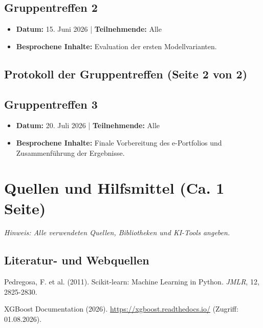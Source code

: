 \documentclass[11pt,a4paper]{article}
\begin{document}
\subsection*{Gruppentreffen 2}
\begin{itemize}[leftmargin=*]
    \item \textbf{Datum:} 15. Juni 2026 | \textbf{Teilnehmende:} Alle
    \item \textbf{Besprochene Inhalte:} Evaluation der ersten Modellvarianten.
\end{itemize}

\newpage
\subsection*{Protokoll der Gruppentreffen (Seite 2 von 2)}
\subsection*{Gruppentreffen 3}
\begin{itemize}[leftmargin=*]
    \item \textbf{Datum:} 20. Juli 2026 | \textbf{Teilnehmende:} Alle
    \item \textbf{Besprochene Inhalte:} Finale Vorbereitung des e-Portfolios und Zusammenführung der Ergebnisse.
\end{itemize}
\lipsum[21-22]

\newpage
\fi

\section{Quellen und Hilfsmittel (Ca. 1 Seite)}
\label{sec:quellen}

\textit{Hinweis: Alle verwendeten Quellen, Bibliotheken und KI-Tools angeben.}

\subsection{Literatur- und Webquellen}
\begin{enumerate}[label={[\arabic*]}]
    \item Pedregosa, F. et al. (2011). Scikit-learn: Machine Learning in Python. \textit{JMLR}, 12, 2825-2830.
    \item XGBoost Documentation (2026). \url{https://xgboost.readthedocs.io/} (Zugriff: 01.08.2026).
\end{enumerate}
\end{document}
